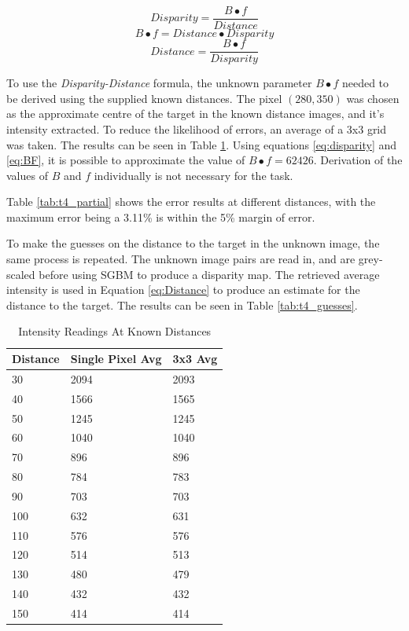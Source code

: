 \documentclass[conference]{IEEEtran}
\begin{document}
\begin{equation} \label{eq:disparity}
Disparity = \frac{B \bullet f}{Distance}
\end{equation}
\begin{equation} \label{eq:BF}
B \bullet f = Distance \bullet Disparity
\end{equation}
\begin{equation}	\label{eq:Distance}
Distance = \frac{B\bullet f}{Disparity}
\end{equation}

To use the \textit{Disparity-Distance} formula, the unknown parameter $B \bullet f$ needed to be derived using the supplied known distances. The pixel $(280,350)$ was chosen as the approximate centre of the target in the known distance images, and it's intensity extracted. To reduce the likelihood of errors, an average of a 3x3 grid was taken. The results can be seen in Table \ref{tab:intensity_results}. Using equations \ref{eq:disparity} and \ref{eq:BF}, it is possible to approximate the value of $B \bullet f = 62426$. Derivation of the values of $B$ and $f$ individually is not necessary for the task. 

Table \ref{tab:t4_partial} shows the error results at different distances, with the maximum error being a 3.11\% is within the 5\% margin of error.

To make the guesses on the distance to the target in the unknown image, the same process is repeated. The unknown image pairs are read in, and are grey-scaled before using SGBM to produce a disparity map. The retrieved average intensity is used in Equation \ref{eq:Distance} to produce an estimate for the distance to the target. The results can be seen in Table \ref{tab:t4_guesses}. 

\begin{table}[]
\caption{Intensity Readings At Known Distances}
\label{tab:intensity_results}
\begin{tabular}{|l|l|l|}
\hline
\textbf{Distance} & \textbf{Single Pixel Avg} & \textbf{3x3 Avg} \\ \hline
30                 & 2094 & 2093         \\ \hline
40                & 1566 & 1565         \\ \hline
50                 & 1245 & 1245         \\ \hline
60                 & 1040 & 1040         \\ \hline
70                 & 896 & 896         \\ \hline
80                & 784 & 783         \\ \hline
90                & 703 & 703         \\ \hline
100                 & 632 & 631          \\ \hline
110      & 576 & 576           \\ \hline
120      & 514 & 513         \\ \hline
130                 & 480 &479          \\ \hline
140				& 432	& 432	\\ \hline
150				&	414 & 414	\\ \hline
\end{tabular}
\end{table} 
\end{document}

